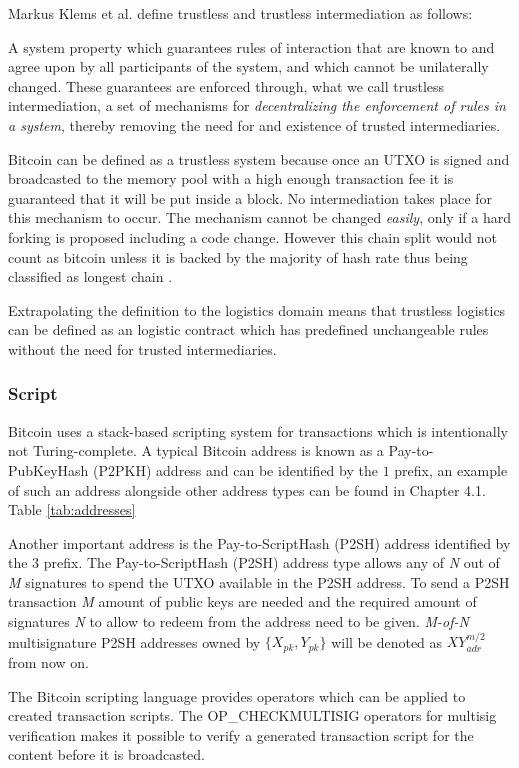 Markus Klems et al. define trustless and trustless intermediation as follows:

\begin{displayquote}
   A system property which guarantees rules of interaction that are known to and agree upon by all participants of the system, and which cannot be unilaterally changed. These guarantees are enforced through, what we call trustless intermediation, a set of mechanisms for \textit{decentralizing the enforcement of rules in a system}, thereby removing the need for and existence of trusted intermediaries. \cite{trustlessIntermediationInBCServiceMarket}
\end{displayquote}

Bitcoin can be defined as a trustless system because once an UTXO is signed and broadcasted to the memory pool with a high enough transaction fee it is guaranteed that it will be put inside a block. No intermediation takes place for this mechanism to occur. The mechanism cannot be changed \textit{easily}, only if a hard forking is proposed including a code change. However this chain split would not count as bitcoin unless it is backed by the majority of hash rate thus being classified as longest chain \cite{nakamoto2008bitcoin}. \par
Extrapolating the definition to the logistics domain means that trustless logistics can be defined as an logistic contract which has predefined unchangeable rules without the need for trusted intermediaries.

\subsubsection{Script}

Bitcoin uses a stack-based scripting system for transactions which is intentionally not Turing-complete. A typical Bitcoin address is known as a Pay-to-PubKeyHash (P2PKH) address and can be identified by the $1$ prefix, an example of such an address alongside other address types can be found in Chapter 4.1. Table \ref{tab:addresses}\par
Another important address is the Pay-to-ScriptHash (P2SH) address identified by the $3$ prefix. The Pay-to-ScriptHash (P2SH) address type allows any of \textit{N} out of \textit{M} signatures to spend the UTXO available in the P2SH address. To send a P2SH transaction \textit{M} amount of public keys are needed and the required amount of signatures \textit{N} to allow to redeem from the address need to be given. \textit{M-of-N} multisignature P2SH addresses owned by $\{X_{pk}, Y_{pk}\}$ will be denoted as \(XY_{adr}^{m/2}\) from now on. \par
The Bitcoin scripting language provides operators which can be applied to created transaction scripts. The OP\_CHECKMULTISIG operators for multisig verification makes it possible to verify a generated transaction script for the content before it is broadcasted. \par

